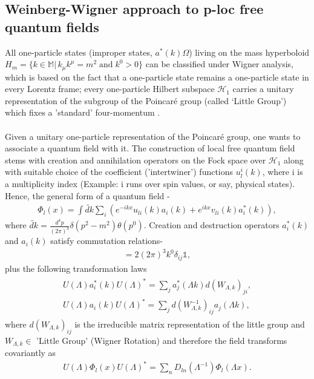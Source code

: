 \documentclass[12pt,a4paper]{article}
\numberwithin{equation}{section}
\begin{document}
\subsection{Weinberg-Wigner approach to p-loc free quantum fields}
All one-particle states (improper states, $a^*(k)\Omega$)  living on the mass hyperboloid $H_m=\{k\in\mathbb{M}|\,k_\mu k^\mu=m^2 \;\text{and}\; k^0>0\}$ can be classified under Wigner analysis, which is based on the fact that a one-particle state remains a one-particle state in every Lorentz frame; every one-particle Hilbert subspace $\mathcal{H}_1$ carries a unitary representation of the subgroup of the Poincar{\'e} group (called `Little Group') which fixes a 'standard' four-momentum \cite{weinberg_1995}. \\
\\
Given a unitary one-particle representation of the Poincar{\'e} group, one wants to associate a quantum field with it. 
The construction of local free quantum field stems with creation and annihilation operators on the Fock space over $\mathcal{H}_1$ along with suitable choice of the coefficient ('intertwiner') functions $u^i_l(k)$, where i is a multiplicity index (Example: i runs over spin values, or say, physical states). Hence, the general form of a quantum field - 
\begin{align}
\Phi_{l}(x)=\int \widetilde{d k} \sum_{i}\left(e^{-i k x} u_{l i}(k) a_{i}(k)+e^{i k x} v_{l i}(k) a_{i}^{*}(k)\right),
\end{align}
where $\widetilde{d k}=\frac{d^{4} p}{(2 \pi)^{3}} \delta\left(p^{2}-m^{2}\right) \theta\left(p^{0}\right)$.   
Creation and destruction operators $a_{i}^*(k)$ and $a_i(k)$ satisfy commutation relations- 
\begin{align}
[a_i(k),a_j^*(k')]=2(2\pi)^3k^0\delta_{ij}\mathds{1},
\end{align}
plus the following transformation laws 
\begin{align}
\begin{array}{l}
U(\Lambda) a_{i}^{*}(k) U(\Lambda)^{*}=\sum_{j} a_{j}^{*}(\Lambda k) d\left(W_{\Lambda, k}\right)_{j i}, \\
U(\Lambda) a_{i}(k) U(\Lambda)^{*}=\sum_{j} d\left(W_{\Lambda, k}^{-1}\right)_{i j} a_{j}(\Lambda k),
\end{array}
\end{align}
where $d(W_{\Lambda,k})_{ij}$ is the irreducible matrix representation of the little group and $W_{\Lambda,k}\in$ 'Little Group' (Wigner Rotation) 
and therefore the field transforms covariantly as  
\begin{align}\label{eq:1.4}
U(\Lambda)\Phi_l(x)U(\Lambda)^*=\sum_n D_{ln}(\Lambda^{-1})\Phi_l(\Lambda x).
\end{align}
\end{document}
